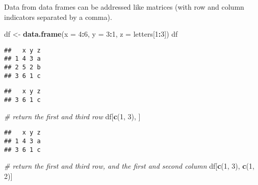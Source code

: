 \documentclass[
]{book}
\newenvironment{Shaded}{\begin{snugshade}}{\end{snugshade}}
\newcommand{\CommentTok}[1]{\textcolor[rgb]{0.56,0.35,0.01}{\textit{#1}}}
\newcommand{\DataTypeTok}[1]{\textcolor[rgb]{0.13,0.29,0.53}{#1}}
\newcommand{\DecValTok}[1]{\textcolor[rgb]{0.00,0.00,0.81}{#1}}
\newcommand{\KeywordTok}[1]{\textcolor[rgb]{0.13,0.29,0.53}{\textbf{#1}}}
\newcommand{\NormalTok}[1]{#1}
\newcommand{\OperatorTok}[1]{\textcolor[rgb]{0.81,0.36,0.00}{\textbf{#1}}}
\newcommand{\StringTok}[1]{\textcolor[rgb]{0.31,0.60,0.02}{#1}}
\begin{document}
Data from data frames can be addressed like matrices (with row and column indicators separated by a comma).

\begin{Shaded}
\begin{Highlighting}[]
\NormalTok{df \textless{}{-}}\StringTok{ }\KeywordTok{data.frame}\NormalTok{(}\DataTypeTok{x =} \DecValTok{4}\OperatorTok{:}\DecValTok{6}\NormalTok{, }\DataTypeTok{y =} \DecValTok{3}\OperatorTok{:}\DecValTok{1}\NormalTok{, }\DataTypeTok{z =}\NormalTok{ letters[}\DecValTok{1}\OperatorTok{:}\DecValTok{3}\NormalTok{])}
\NormalTok{df}
\end{Highlighting}
\end{Shaded}

\begin{verbatim}
##   x y z
## 1 4 3 a
## 2 5 2 b
## 3 6 1 c
\end{verbatim}

\begin{Shaded}
\end{Shaded}

\begin{verbatim}
##   x y z
## 3 6 1 c
\end{verbatim}

\begin{Shaded}
\begin{Highlighting}[]
\CommentTok{\# return the first and third row}
\NormalTok{df[}\KeywordTok{c}\NormalTok{(}\DecValTok{1}\NormalTok{, }\DecValTok{3}\NormalTok{), ]}
\end{Highlighting}
\end{Shaded}

\begin{verbatim}
##   x y z
## 1 4 3 a
## 3 6 1 c
\end{verbatim}

\begin{Shaded}
\begin{Highlighting}[]
\CommentTok{\# return the first and third row, and the first and second column}
\NormalTok{df[}\KeywordTok{c}\NormalTok{(}\DecValTok{1}\NormalTok{, }\DecValTok{3}\NormalTok{), }\KeywordTok{c}\NormalTok{(}\DecValTok{1}\NormalTok{, }\DecValTok{2}\NormalTok{)]}
\end{Highlighting}
\end{Shaded}
\end{document}
